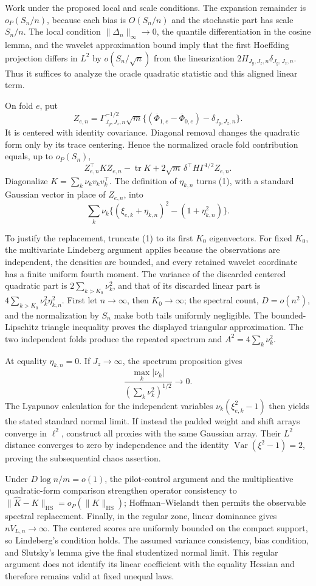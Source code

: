 Work under the proposed local and scale conditions.  The expansion remainder is \(o_P(S_n/n)\), because each bias is \(O(S_n/n)\) and the stochastic part has scale \(S_n/n\).  The local condition \(\|\Delta_n\|_\infty\to0\), the quantile differentiation in the cosine lemma, and the wavelet approximation bound imply that the first Hoeffding projection differs in \(L^2\) by \(o(S_n/\sqrt n)\) from the linearization \(2H_{J_y,J_z,n}\delta_{J_y,J_z,n}\).  Thus it suffices to analyze the oracle quadratic statistic and this aligned linear term.

On fold \(e\), put
\[
 Z_{e,n}=\Gamma_{J_y,J_z,n}^{-1/2}\sqrt m
 \{(\overline\Phi_{1,e}-\overline\Phi_{0,e})-\delta_{J_y,J_z,n}\}.
\]
It is centered with identity covariance.  Diagonal removal changes the quadratic form only by its trace centering.  Hence the normalized oracle fold contribution equals, up to \(o_P(S_n)\),
\[
 Z_{e,n}^{\top}KZ_{e,n}-\operatorname{tr}K
 +2\sqrt m\,\delta^{\top}H\Gamma^{1/2}Z_{e,n}.          \tag{1}
\]
Diagonalize \(K=\sum_k\nu_kv_kv_k^\top\).  The definition of \(\eta_{k,n}\) turns (1), with a standard Gaussian vector in place of \(Z_{e,n}\), into
\[
 \sum_k\nu_k\{(\xi_{e,k}+\eta_{k,n})^2-(1+\eta_{k,n}^2)\}. \tag{2}
\]

To justify the replacement, truncate (1) to its first \(K_0\) eigenvectors.  For fixed \(K_0\), the multivariate Lindeberg argument applies because the observations are independent, the densities are bounded, and every retained wavelet coordinate has a finite uniform fourth moment.  The variance of the discarded centered quadratic part is \(2\sum_{k>K_0}\nu_k^2\), and that of its discarded linear part is \(4\sum_{k>K_0}\nu_k^2\eta_{k,n}^2\).  First let \(n\to\infty\), then \(K_0\to\infty\); the spectral count, \(D=o(n^2)\), and the normalization by \(S_n\) make both tails uniformly negligible.  The bounded-Lipschitz triangle inequality proves the displayed triangular approximation.  The two independent folds produce the repeated spectrum and \(A^2=4\sum_k\nu_k^2\).

At equality \(\eta_{k,n}=0\).  If \(J_z\to\infty\), the spectrum proposition gives
\[
 \frac{\max_k|\nu_k|}{(\sum_k\nu_k^2)^{1/2}}\to0.
\]
The Lyapunov calculation for the independent variables \(\nu_k(\xi_{e,k}^2-1)\) then yields the stated standard normal limit.  If instead the padded weight and shift arrays converge in \(\ell^2\), construct all proxies with the same Gaussian array.  Their \(L^2\) distance converges to zero by independence and the identity \(\operatorname{Var}(\xi^2-1)=2\), proving the subsequential chaos assertion.

Under \(D\log n/m=o(1)\), the pilot-control argument and the multiplicative quadratic-form comparison strengthen operator consistency to \(\|\widehat K-K\|_{\mathrm{HS}}=o_P(\|K\|_{\mathrm{HS}})\); Hoffman--Wielandt then permits the observable spectral replacement.  Finally, in the regular zone, linear dominance gives \(nV_{L,n}\to\infty\).  The centered scores are uniformly bounded on the compact support, so Lindeberg's condition holds.  The assumed variance consistency, bias condition, and Slutsky's lemma give the final studentized normal limit.  This regular argument does not identify its linear coefficient with the equality Hessian and therefore remains valid at fixed unequal laws.